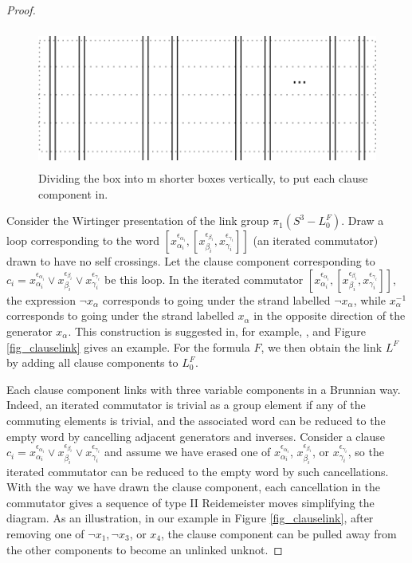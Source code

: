 \documentclass[12pt]{amsart}
\theoremstyle{definition}
\theoremstyle{remark}
\begin{document}
\begin{proof}
\begin{figure}[ht]
\centering
\includegraphics[height=1.8in]{relationarea.png}
\caption{Dividing the box into m shorter boxes vertically, to put each clause component in.
}
\label{fig_relationarea}
\end{figure}


Consider the Wirtinger presentation of the link group $\pi_1(S^3-L^F_0)$.
Draw a loop corresponding to the word $[x_{\alpha_i}^{\epsilon_{\alpha_i}}, [ x_{\beta_i}^{\epsilon_{\beta_i}}, x_{\gamma_i}^{\epsilon_{\gamma_i}}]]$ (an iterated commutator) drawn to have no self crossings.
Let the clause component corresponding to $c_i = x_{\alpha_i}^{\epsilon_{\alpha_i}} \vee x_{\beta_i}^{\epsilon_{\beta_i}} \vee x_{\gamma_i}^{\epsilon_{\gamma_i}}$  be this loop.
In the iterated commutator $[x_{\alpha_i}^{\epsilon_{\alpha_i}}, [ x_{\beta_i}^{\epsilon_{\beta_i}}, x_{\gamma_i}^{\epsilon_{\gamma_i}}]]$, the expression $\neg x_\alpha$ corresponds to going under the strand labelled $\neg x_\alpha$, while $x_\alpha^{-1}$ corresponds to going under the strand labelled $x_\alpha$ in the opposite direction of the generator $x_\alpha$.
This construction is suggested in, for example, \cite{Rolfsen1}, and Figure \ref{fig_clauselink} gives an example.
For the formula $F$, we then obtain the link $L^F$ by adding all clause components to $L_0^F$.

Each clause component links with three variable components in a Brunnian way.
Indeed, an iterated commutator is trivial as a group element if any of the commuting elements is trivial, and the associated word can be reduced to the empty word by cancelling adjacent generators and inverses.
Consider a clause $c_i = x_{\alpha_i}^{\epsilon_{\alpha_i}} \vee x_{\beta_i}^{\epsilon_{\beta_i}} \vee x_{\gamma_i}^{\epsilon_{\gamma_i}}$ and assume we have erased one of $x_{\alpha_i}^{\epsilon_{\alpha_i}}$, $x_{\beta_i}^{\epsilon_{\beta_i}}$, or $x_{\gamma_i}^{\epsilon_{\gamma_i}}$, so the iterated commutator can be reduced to the empty word by such cancellations.
With the way we have drawn the clause component, each cancellation in the commutator gives a sequence of type II Reidemeister moves simplifying the diagram.
As an illustration, in our example in Figure \ref{fig_clauselink}, after removing one of $\neg x_1, \neg x_3$, or $x_4$, the clause component can be pulled away from the other components to become an unlinked unknot.


\end{proof}
\end{document}
